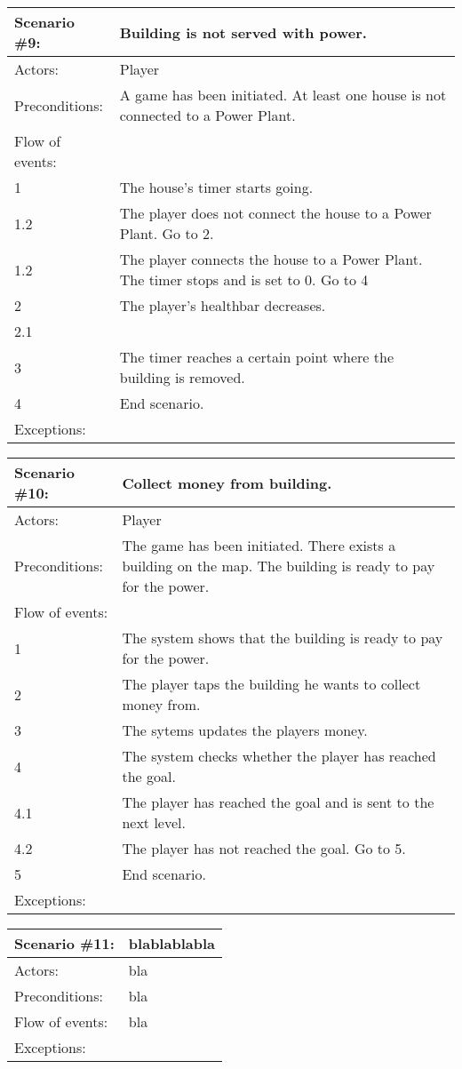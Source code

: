 \begin{tabular}{| l | p{10cm} |}
	\hline
	{\bf Scenario \#9:} & {\bf Building is not served with power.} \\ \hline
	Actors: & Player \\ \hline
	Preconditions: & A game has been initiated. At least one house is not connected to a Power Plant. \\ \hline
	Flow of events: & \\ \hline
	1 & The house's timer starts going. \\ \hline
	1.2 & The player does not connect the house to a Power Plant. Go to 2. \\ \hline
	1.2 & The player connects the house to a Power Plant. The timer stops and is set to 0. Go to 4 \\ \hline
	2 & The player's healthbar decreases. \\ \hline
	2.1 & \\ \hline
	3 & The timer reaches a certain point where the building is removed. \\ \hline
	4 & End scenario. \\ \hline
	Exceptions: & \\ \hline
	
\end{tabular}

\begin{tabular}{| l | p{10cm} |}
	\hline
	{\bf Scenario \#10:} & {\bf Collect money from building.} \\ \hline
	Actors: & Player \\ \hline
	Preconditions: & The game has been initiated. There exists a building on the map. The building is ready to pay for the power. \\ \hline
	Flow of events: & \\ \hline
	1 & The system shows that the building is ready to pay for the power. \\ \hline
	2 & The player taps the building he wants to collect money from. \\ \hline
	3 & The sytems updates the players money. \\ \hline
	4 & The system checks whether the player has reached the goal. \\ \hline
	4.1 & The player has reached the goal and is sent to the next level. \\ \hline
	4.2 & The player has not reached the goal. Go to 5. \\ \hline
	5 & End scenario. \\ \hline
	Exceptions: \\ \hline
\end{tabular}

\begin{tabular}{| l | p{10cm} |}
	\hline
	{\bf Scenario \#11:} & {\bf blablablabla} \\ \hline
	Actors: & bla \\ \hline
	Preconditions: & bla \\ \hline
	Flow of events: & bla \\ \hline
	Exceptions: \\ \hline
\end{tabular}